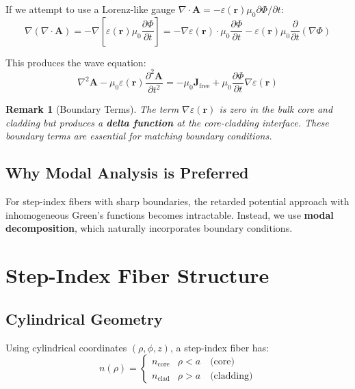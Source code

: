 \documentclass[12pt,a4paper]{article}
\newtheorem{remark}{Remark}
\begin{document}
If we attempt to use a Lorenz-like gauge $\nabla \cdot \mathbf{A} = -\varepsilon(\mathbf{r}) \mu_0 \partial \Phi/\partial t$:
\begin{equation}
\nabla(\nabla \cdot \mathbf{A}) = -\nabla\left[\varepsilon(\mathbf{r}) \mu_0 \frac{\partial \Phi}{\partial t}\right] = -\nabla \varepsilon(\mathbf{r}) \cdot \mu_0 \frac{\partial \Phi}{\partial t} - \varepsilon(\mathbf{r}) \mu_0 \frac{\partial}{\partial t}(\nabla \Phi)
\end{equation}

This produces the wave equation:
\begin{equation}
\nabla^2 \mathbf{A} - \mu_0 \varepsilon(\mathbf{r}) \frac{\partial^2 \mathbf{A}}{\partial t^2} = -\mu_0 \mathbf{J}_{\text{free}} + \mu_0 \frac{\partial \Phi}{\partial t} \nabla \varepsilon(\mathbf{r}) \label{eq:wave_inhomo}
\end{equation}

\begin{remark}[Boundary Terms]
The term $\nabla \varepsilon(\mathbf{r})$ is zero in the bulk core and cladding but produces a \textbf{delta function} at the core-cladding interface. These boundary terms are essential for matching boundary conditions.
\end{remark}

\subsection{Why Modal Analysis is Preferred}

For step-index fibers with sharp boundaries, the retarded potential approach with inhomogeneous Green's functions becomes intractable. Instead, we use \textbf{modal decomposition}, which naturally incorporates boundary conditions.

\section{Step-Index Fiber Structure}

\subsection{Cylindrical Geometry}

Using cylindrical coordinates $(\rho, \phi, z)$, a step-index fiber has:
\begin{equation}
n(\rho) = \begin{cases}
n_{\text{core}} & \rho < a \quad \text{(core)}\\
n_{\text{clad}} & \rho > a \quad \text{(cladding)}
\end{cases} \label{eq:step_index}
\end{equation}
\end{document}
